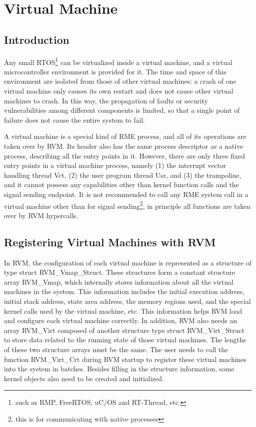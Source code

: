 \chapter{Virtual Machine}\label{ch:4-virtual-machines}

\section{Introduction}\label{sec:4-1}

Any small RTOS\footnote{such as RMP, FreeRTOS, uC/OS and RT-Thread, etc.} can be virtualized inside a virtual machine, and a virtual microcontroller environment is provided for it. The time and space of this environment are isolated from those of other virtual machines: a crash of one virtual machine only causes its own restart and does not cause other virtual machines to crash. In this way, the propagation of faults or security vulnerabilities among different components is limited, so that a single point of failure does not cause the entire system to fail.

A virtual machine is a special kind of RME process, and all of its operations are taken over by RVM. Its header also has the same process descriptor as a native process, describing all the entry points in it. However, there are only three fixed entry points in a virtual machine process, namely (1) the interrupt vector handling thread Vct, (2) the user program thread Usr, and (3) the trampoline, and it cannot possess any capabilities other than kernel function calls and the signal sending endpoint. It is not recommended to call any RME system call in a virtual machine other than for signal sending\footnote{this is for communicating with native processes}; in principle all functions are taken over by RVM hypercalls.

\section{Registering Virtual Machines with RVM}\label{sec:4-2}

In RVM, the configuration of each virtual machine is represented as a structure of type struct RVM\_Vmap\_Struct. These structures form a constant structure array RVM\_Vmap, which internally stores information about all the virtual machines in the system. This information includes the initial execution address, initial stack address, state area address, the memory regions used, and the special kernel calls used by the virtual machine, etc. This information helps RVM load and configure each virtual machine correctly. In addition, RVM also needs an array RVM\_Virt composed of another structure type struct RVM\_Virt\_Struct to store data related to the running state of those virtual machines. The lengths of these two structure arrays must be the same. The user needs to call the function RVM\_Virt\_Crt during RVM startup to register these virtual machines into the system in batches. Besides filling in the structure information, some kernel objects also need to be created and initialized.

